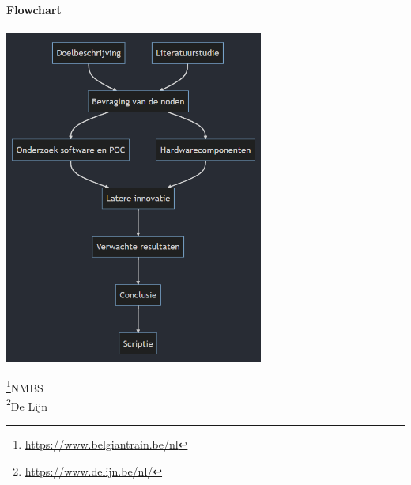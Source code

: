 \documentclass{hogent-article}
\begin{document}
    
    \textbf{Flowchart} \\\\
    \includegraphics[width=\columnwidth,height=11cm]{flow}
    
    
    \printbibliography[heading=bibintoc]
    
    \footnote{\url{https://www.belgiantrain.be/nl}}NMBS \\
    \footnote{\url{https://www.delijn.be/nl/}}De Lijn
     
\end{document}
